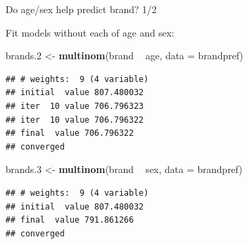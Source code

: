 \documentclass[ignorenonframetext,]{beamer}
\newenvironment{Shaded}{\begin{snugshade}}{\end{snugshade}}
\newcommand{\DataTypeTok}[1]{\textcolor[rgb]{0.13,0.29,0.53}{#1}}
\newcommand{\FloatTok}[1]{\textcolor[rgb]{0.00,0.00,0.81}{#1}}
\newcommand{\KeywordTok}[1]{\textcolor[rgb]{0.13,0.29,0.53}{\textbf{#1}}}
\newcommand{\NormalTok}[1]{#1}
\newcommand{\OperatorTok}[1]{\textcolor[rgb]{0.81,0.36,0.00}{\textbf{#1}}}
\newcommand{\StringTok}[1]{\textcolor[rgb]{0.31,0.60,0.02}{#1}}
\begin{document}
\begin{frame}[fragile]{Do age/sex help predict brand? 1/2}
\protect\hypertarget{do-agesex-help-predict-brand-12}{}

Fit models without each of age and sex:

\begin{Shaded}
\begin{Highlighting}[]
\NormalTok{brands}\FloatTok{.2}\NormalTok{ <-}\StringTok{ }\KeywordTok{multinom}\NormalTok{(brand }\OperatorTok{~}\StringTok{ }\NormalTok{age, }\DataTypeTok{data =}\NormalTok{ brandpref)}
\end{Highlighting}
\end{Shaded}

\begin{verbatim}
## # weights:  9 (4 variable)
## initial  value 807.480032 
## iter  10 value 706.796323
## iter  10 value 706.796322
## final  value 706.796322 
## converged
\end{verbatim}

\begin{Shaded}
\begin{Highlighting}[]
\NormalTok{brands}\FloatTok{.3}\NormalTok{ <-}\StringTok{ }\KeywordTok{multinom}\NormalTok{(brand }\OperatorTok{~}\StringTok{ }\NormalTok{sex, }\DataTypeTok{data =}\NormalTok{ brandpref)}
\end{Highlighting}
\end{Shaded}

\begin{verbatim}
## # weights:  9 (4 variable)
## initial  value 807.480032 
## final  value 791.861266 
## converged
\end{verbatim}

\end{frame}
\end{document}
